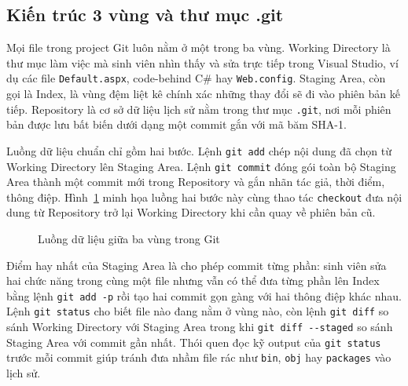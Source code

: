 \subsection{Kiến trúc 3 vùng và thư mục .git}
\label{subsec:c2-1-ba-vung}

Mọi file trong project Git luôn nằm ở một trong ba vùng. Working Directory là thư mục làm việc mà sinh viên nhìn thấy và sửa trực tiếp trong Visual Studio, ví dụ các file \texttt{Default.aspx}, code-behind C\# hay \texttt{Web.config}. Staging Area, còn gọi là Index, là vùng đệm liệt kê chính xác những thay đổi sẽ đi vào phiên bản kế tiếp. Repository là cơ sở dữ liệu lịch sử nằm trong thư mục \texttt{.git}, nơi mỗi phiên bản được lưu bất biến dưới dạng một commit gắn với mã băm SHA-1.

Luồng dữ liệu chuẩn chỉ gồm hai bước. Lệnh \verb|git add| chép nội dung đã chọn từ Working Directory lên Staging Area. Lệnh \verb|git commit| đóng gói toàn bộ Staging Area thành một commit mới trong Repository và gắn nhãn tác giả, thời điểm, thông điệp. Hình~\ref{fig:c2-1-ba-vung} minh họa luồng hai bước này cùng thao tác \texttt{checkout} đưa nội dung từ Repository trở lại Working Directory khi cần quay về phiên bản cũ.

\begin{figure}[H]
\centering
{}
\caption{Luồng dữ liệu giữa ba vùng trong Git}
\label{fig:c2-1-ba-vung}
\end{figure}

Điểm hay nhất của Staging Area là cho phép commit từng phần: sinh viên sửa hai chức năng trong cùng một file nhưng vẫn có thể đưa từng phần lên Index bằng lệnh \verb|git add -p| rồi tạo hai commit gọn gàng với hai thông điệp khác nhau. Lệnh \verb|git status| cho biết file nào đang nằm ở vùng nào, còn lệnh \verb|git diff| so sánh Working Directory với Staging Area trong khi \verb|git diff --staged| so sánh Staging Area với commit gần nhất. Thói quen đọc kỹ output của \verb|git status| trước mỗi commit giúp tránh đưa nhầm file rác như \texttt{bin}, \texttt{obj} hay \texttt{packages} vào lịch sử.

